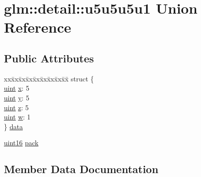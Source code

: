 \hypertarget{unionglm_1_1detail_1_1u5u5u5u1}{}\section{glm\+:\+:detail\+:\+:u5u5u5u1 Union Reference}
\label{unionglm_1_1detail_1_1u5u5u5u1}
\subsection*{Public Attributes}
\begin{DoxyCompactItemize}
\item 
\begin{tabbing}
xx\=xx\=xx\=xx\=xx\=xx\=xx\=xx\=xx\=\kill
struct \{\\
\>\mbox{\hyperlink{group__core__precision_ga4fd29415871152bfb5abd588334147c8}{uint}} \mbox{\hyperlink{unionglm_1_1detail_1_1u5u5u5u1_a2d802a46e48a88f87754882be376b34f}{x}}: 5\\
\>\mbox{\hyperlink{group__core__precision_ga4fd29415871152bfb5abd588334147c8}{uint}} \mbox{\hyperlink{unionglm_1_1detail_1_1u5u5u5u1_a8dff950581d19ad8a5137dbfffc63a64}{y}}: 5\\
\>\mbox{\hyperlink{group__core__precision_ga4fd29415871152bfb5abd588334147c8}{uint}} \mbox{\hyperlink{unionglm_1_1detail_1_1u5u5u5u1_a110d067e1f37f6137c2806102c4508f6}{z}}: 5\\
\>\mbox{\hyperlink{group__core__precision_ga4fd29415871152bfb5abd588334147c8}{uint}} \mbox{\hyperlink{unionglm_1_1detail_1_1u5u5u5u1_a1dc286ba6a4f8b0c04db3997af661cd5}{w}}: 1\\
\} \mbox{\hyperlink{unionglm_1_1detail_1_1u5u5u5u1_a22d17eb5ead264ae4d99e3beff2ed1a9}{data}}\\

\end{tabbing}\item 
\mbox{\hyperlink{namespaceglm_1_1detail_a47b2a7d006d187338e8031a352d1ce56}{uint16}} \mbox{\hyperlink{unionglm_1_1detail_1_1u5u5u5u1_acbc99680c58046aeb5c4f2b284680a8b}{pack}}
\end{DoxyCompactItemize}


\subsection{Member Data Documentation}
\mbox{\label{unionglm_1_1detail_1_1u5u5u5u1_a22d17eb5ead264ae4d99e3beff2ed1a9}} 

